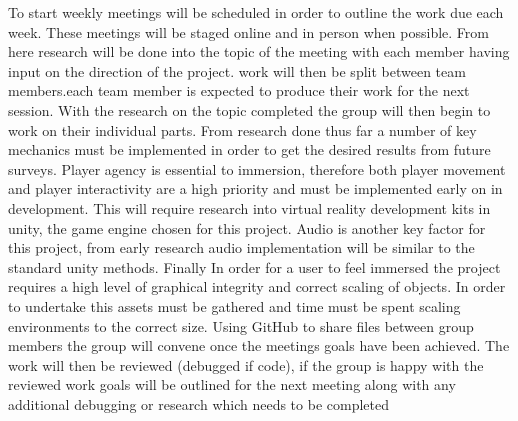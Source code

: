 To start weekly meetings will be scheduled in order to outline the work due each week. These meetings will be staged online and in person when possible. From here research will be done into the topic of the meeting with each member having input on the direction of the project. work will then be split between team members.each team member is expected to produce their work for the next session. With the research on the topic completed the group will then begin to work on their individual parts. From research done thus far a number of key mechanics must be implemented in order to get the desired results from future surveys. Player agency is essential to immersion, therefore both player movement and player interactivity are a high priority and must be implemented early on in development. This will require research into virtual reality development kits in unity, the game engine chosen for this project. Audio is another key factor for this project, from early research audio implementation will be similar to the standard unity methods. Finally In order for a user to feel immersed the project requires a high level of graphical integrity and correct scaling of objects. In order to undertake this assets must be gathered and time must be spent scaling environments to the correct size. Using GitHub to share files between group members the group will convene once the meetings goals have been achieved. The work will then be reviewed (debugged if code), if the group is happy with the reviewed work goals will be outlined for the next meeting along with any additional debugging or research which needs to be completed 

